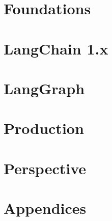 \documentclass[11pt,twoside,openright]{book}
\begin{document}
\frontmatter



\tableofcontents
\listoffigures



\mainmatter

\part{Foundations}





\part{LangChain 1.x}




\part{LangGraph}





\part{Production}





\part{Perspective}



\appendix
\part{Appendices}







\backmatter

\printindex
\end{document}
